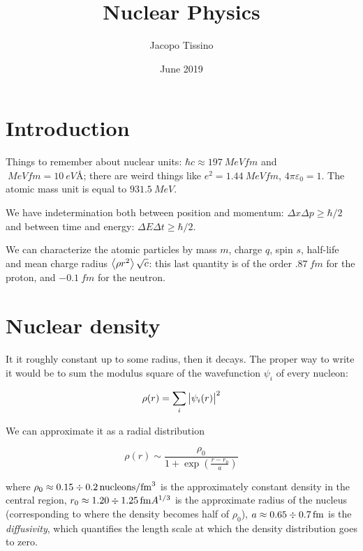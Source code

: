 \documentclass{article}
\author{Jacopo Tissino}
\title{Nuclear Physics}
\date{June 2019}
\begin{document}
\maketitle

\section{Introduction}

Things to remember about nuclear units: \(\hbar c \approx \SI{197}{MeV fm} \) and \(\SI{}{MeV fm} = \SI{10}{eV \angstrom} \); there are weird things like \(e^2 = \SI{1.44}{MeV fm} \), \(4 \pi \varepsilon_0 = 1\). The atomic mass unit is equal to \(\SI{931.5}{MeV} \).

We have indetermination both between position and momentum: \(\Delta x \Delta p \geq \hbar/2\) and between time and energy: \(\Delta E \Delta t \geq \hbar /2\).

We can characterize the atomic particles by mass \(m\), charge \(q\), spin \(s\), half-life and mean charge radius \(\expval{\rho r^2} \sqrt{c} \): this last quantity is of the order \(\SI{.87}{fm}\) for the proton, and \(\SI{-0.1}{fm} \) for the neutron.

\section{Nuclear density}

It it roughly constant up to some radius, then it decays.
The proper way to write it would be to sum the modulus square of the wavefunction \(\psi_i\) of every nucleon:

\begin{equation}
    \rho(r) = \sum _{i} \abs{\psi_i (r)}^2
\end{equation}

We can approximate it as a radial distribution

\begin{equation}
    \rho(r) \sim \frac{\rho_0}{1 + \exp(\frac{r - r_0}{a})}
\end{equation}

where \(\rho_0 \approx 0.15 \divisionsymbol \SI{0.2}{ nucleons  \per fm^3} \) is the approximately constant density in the central region, \(r_0 \approx 1.20 \divisionsymbol \SI{1.25}{fm} A ^{1/3}  \) is the approximate radius of the nucleus (corresponding to where the density becomes half of \(\rho_0\)), \(a \approx 0.65 \divisionsymbol \SI{0.7}{fm} \) is the \emph{diffusivity}, which quantifies the length scale at which the density distribution goes to zero.
\end{document}
